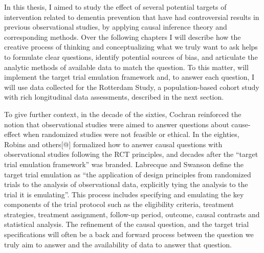 \documentclass[
]{book}
\begin{document}
In this thesis, I aimed to study the effect of several potential targets of intervention related to dementia prevention that have had controversial results in previous observational studies, by applying causal inference theory and corresponding methods. Over the following chapters I will describe how the creative process of thinking and conceptualizing what we truly want to ask helps to formulate clear questions, identify potential sources of bias, and articulate the analytic methods of available data to match the question. To this matter, will implement the target trial emulation framework\autocite{hernan_robins_2016,labrecque2018} and, to answer each question, I will use data collected for the Rotterdam Study, a population-based cohort study with rich longitudinal data assessments\autocite{ikram2020}, described in the next section.

To give further context, in the decade of the sixties, Cochran reinforced the notion that observational studies were aimed to answer questions about cause-effect when randomized studies were not feasible or ethical\autocite{cochran1965}. In the eighties, Robins and others{[}@{]} formalized how to answer causal questions with observational studies following the RCT principles, and decades after the ``target trial emulation framework'' was branded\autocite{hernan_robins_2016}. Labrecque and Swanson define the target trial emulation as ``the application of design principles from randomized trials to the analysis of observational data, explicitly tying the analysis to the trial it is emulating''\autocite{labrecque2018}. This process includes specifying and emulating the key components of the trial protocol such as the eligibility criteria, treatment strategies, treatment assignment, follow-up period, outcome, causal contrasts and statistical analysis. The refinement of the causal question, and the target trial specifications will often be a back and forward process between the question we truly aim to answer and the availability of data to answer that question\autocite{labrecque2018,whatif2020}.
\end{document}
